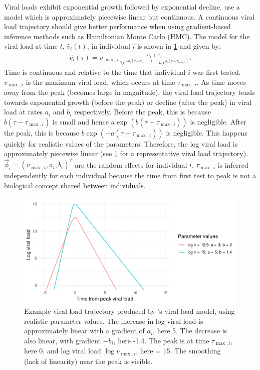 \documentclass[thesis.tex]{subfiles}
\begin{document}
Viral loads exhibit exponential growth followed by exponential decline.
\Textcite{hakkiOnset} use a model which is approximately piecewise linear but continuous.
A continuous viral load trajectory should give better performance when using gradient-based inference methods such as Hamiltonian Monte Carlo (HMC).
The model for the viral load at time $t$, $\hat{v}_i(t)$, in individual $i$ is shown in \cref{ATACCC:fig:viral-load-model} and given by:
\begin{align}
\hat{v}_i(\tau) = v_{\max,i} \frac{a_i+b_i}{b_ie^{-a_i(\tau-\tau_{\max,i})} + a_ie^{b_i(\tau-\tau_{max,i})}}. \label{ATACCC:eq:viral-load}
\end{align}
Time is continuous and relative to the time that individual $i$ was first tested.
$v_{\max,i}$ is the maximum viral load, which occurs at time $\tau_{\max,i}$.
As time moves away from the peak (\ie becomes large in magnitude), the viral load trajectory tends towards exponential growth (before the peak) or decline (after the peak) in viral load at rates $a_i$ and $b_i$ respectively.
Before the peak, this is because $b(\tau-\tau_{\max,i})$ is small and hence $a\exp(b(\tau-\tau_{\max,i}))$ is negligible.
After the peak, this is because $b\exp(-a(\tau-\tau_{\max,i}))$ is negligible.
This happens quickly for realistic values of the parameters.
Therefore, the log viral load is approximately piecewise linear (see \cref{ATACCC:fig:viral-load-model} for a representative viral load trajectory).
$\vec{\phi}_i = (v_{\max,i}, a_i, b_i)^T$ are the random effects for individual $i$.
$\tau_{\max,i}$ is inferred independently for each individual because the time from first test to peak is not a biological concept shared between individuals.
\begin{figure}
  \centering \includegraphics{ATACCC/typical_trajectory}
  \caption[Example viral load model trajectory.]{Example viral load trajectory produced by \textcite{hakkiOnset}'s viral load model, using realistic parameter values. The increase in log viral load is approximately linear with a gradient of $a_i$, here 5. The decrease is also linear, with gradient $-b_i$, here -1.4. The peak is at time $\tau_{\max,i}$, here 0, and log viral load $\log v_{\max,i}$, here = 15. The smoothing (lack of linearity) near the peak is visible. \label{ATACCC:fig:viral-load-model}}
\end{figure}
\end{document}
